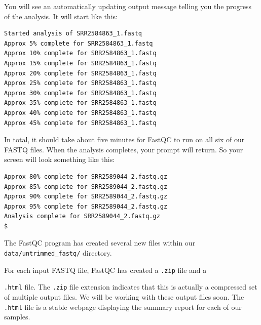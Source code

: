 \documentclass[
  letterpaper,
  DIV=11,
  numbers=noendperiod]{scrreprt}
\newenvironment{Shaded}{\begin{snugshade}}{\end{snugshade}}
\newcommand{\ExtensionTok}[1]{\textcolor[rgb]{0.00,0.23,0.31}{#1}}
\newcommand{\NormalTok}[1]{\textcolor[rgb]{0.00,0.23,0.31}{#1}}
\begin{document}
You will see an automatically updating output message telling you the
progress of the analysis. It will start like this:

\begin{verbatim}
Started analysis of SRR2584863_1.fastq
Approx 5% complete for SRR2584863_1.fastq
Approx 10% complete for SRR2584863_1.fastq
Approx 15% complete for SRR2584863_1.fastq
Approx 20% complete for SRR2584863_1.fastq
Approx 25% complete for SRR2584863_1.fastq
Approx 30% complete for SRR2584863_1.fastq
Approx 35% complete for SRR2584863_1.fastq
Approx 40% complete for SRR2584863_1.fastq
Approx 45% complete for SRR2584863_1.fastq
\end{verbatim}

In total, it should take about five minutes for FastQC to run on all six
of our FASTQ files. When the analysis completes, your prompt will
return. So your screen will look something like this:

\begin{verbatim}
Approx 80% complete for SRR2589044_2.fastq.gz
Approx 85% complete for SRR2589044_2.fastq.gz
Approx 90% complete for SRR2589044_2.fastq.gz
Approx 95% complete for SRR2589044_2.fastq.gz
Analysis complete for SRR2589044_2.fastq.gz
$
\end{verbatim}

The FastQC program has created several new files within our
\texttt{data/untrimmed\_fastq/} directory.

\begin{Shaded}
\end{Shaded}

For each input FASTQ file, FastQC has created a \texttt{.zip} file and a

\texttt{.html} file. The \texttt{.zip} file extension indicates that
this is actually a compressed set of multiple output files. We will be
working with these output files soon. The \texttt{.html} file is a
stable webpage displaying the summary report for each of our samples.
\end{document}
